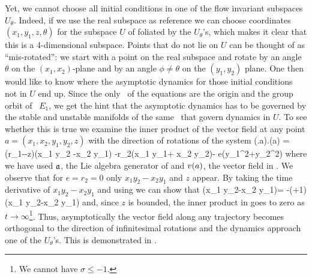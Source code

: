 Yet, we cannot choose all initial conditions
in one of the flow invariant subspaces $U_\theta$. Indeed, if we use the real subspace
as reference we can choose coordinates $(x_1,y_1,z,\theta)$ for the subspace $U$ of 
foliated by the $U_\theta$'s, which makes it clear that this is a 4-dimensional subspace.
Points that do not lie on $U$ can be thought of as ``mis-rotated'': we start with a point on
the real subspace and rotate by an angle $\theta$ on the $(x_1,x_2)$-plane and by an
angle $\phi\neq\theta$ on the $(y_1,y_2)$ plane. One then would like to know where the asymptotic dynamics
for those initial conditions not in $U$ end up. Since the only \eqva\ of the equations are the origin
and the group orbit of \eqv\ $E_1$, we get the hint that the asymptotic dynamics has to be governed
by the stable and unstable manifolds of the same \eqva\ that govern dynamics in $U$.
To see whether this is true we examine the inner product of the vector field at any point  $a=(x_1,x_2,y_1,y_2,z)$  with the direction of
rotations of the system
\beq
	(\Lg.a).\vf(a) = \left(r_1-\sigma-z\right)\left(x_1 y_2 -x_2 y_1\right) -r_2\left(x_1 y_1+ x_2 y_2\right)- e\left(y_1^2+y_2^2\right)
	\label{eq:CLe0ip}
\eeq
where we have used $\mathfrak{a}$, the Lie algebra generator  of  and $v(a)$, the vector field in .
We observe that for $e=r_2=0$ only $x_1 y_2-x_2 y_1$ and $z$ appear. By taking the time derivative of $x_1 y_2-x_2 y_1$ and using 
we can show that
\beq
	\left(x_1 y_2-x_2 y_1\right)= -(\sigma+1)\left(x_1 y_2-x_2 y_1\right)
\eeq
and, since $z$ is bounded, the inner product in  goes to zero as $t\rightarrow\infty$\footnote{We cannot have $\sigma\leq -1$.}. Thus, asymptotically the vector
field along any trajectory becomes orthogonal to the direction of infinitesimal rotations and the dynamics approach one of the $U_\theta$'s.
This is demonstrated in .

